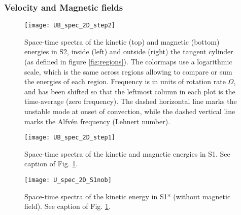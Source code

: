 \documentclass[12pt, a4paper]{article}
\begin{document}
\subsubsection{Velocity and Magnetic fields}


\begin{figure}
\begin{center}
\texttt{[image: UB\_spec\_2D\_step2]}
\caption{Space-time spectra of the kinetic (top) and magnetic (bottom) energies in S2, inside (left) and outside (right) the tangent cylinder (as defined in figure \ref{fig:regions}).
The colormaps use a logarithmic scale, which is the same across regions allowing to compare or sum the energies of each region.
Frequency is in units of rotation rate $\Omega$, and has been shifted so that the leftmost column in each plot is the time-average (zero frequency).
The dashed horizontal line marks the unstable mode at onset of convection, while the dashed vertical line marks the Alfvén frequency (Lehnert number).
}
\label{fig:ub_spec2d_S2}
\end{center}
\end{figure}

\begin{figure}
\begin{center}
\texttt{[image: UB\_spec\_2D\_step1]}
\caption{Space-time spectra of the kinetic and magnetic energies in S1.
See caption of Fig. \ref{fig:ub_spec2d_S2}.
}
\label{fig:ub_spec2d_S1}
\end{center}
\end{figure}

\begin{figure}
\begin{center}
\texttt{[image: U\_spec\_2D\_S1nob]}
\caption{Space-time spectra of the kinetic energy in S1* (without magnetic field).
See caption of Fig. \ref{fig:ub_spec2d_S2}.
}
\label{fig:u_spec2d_S1nob}
\end{center}
\end{figure}
\end{document}
